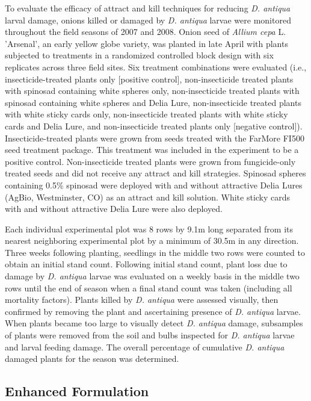 \documentclass[alpha-refs]{wiley-article}
\begin{document}
To evaluate the efficacy of attract and kill techniques for reducing \textit{D. antiqua} larval damage, onions killed or damaged by \textit{D. antiqua} larvae were monitored throughout the field seasons of 2007 and 2008. Onion seed of \textit{Allium cepa} L. ’Arsenal’, an early yellow globe variety, was planted in late April with plants subjected to treatments in a randomized controlled block design with six replicates across three field sites.  Six treatment combinations were evaluated (i.e., insecticide-treated plants only [positive control], non-insecticide treated plants with spinosad containing white spheres only, non-insecticide treated plants with spinosad containing white spheres and Delia Lure, non-insecticide treated plants with white sticky cards only, non-insecticide treated plants with white sticky cards and Delia Lure, and non-insecticide treated plants only [negative control]).  Insecticide-treated plants were grown from seeds treated with the FarMore FI500 seed treatment package. This treatment was included in the experiment to be a positive control. Non-insecticide treated plants were grown from fungicide-only treated seeds and did not receive any attract and kill strategies. Spinosad spheres containing 0.5\% spinosad were deployed with and without attractive Delia Lures (AgBio, Westminster, CO) as an attract and kill solution. White sticky cards with and without attractive Delia Lure were also deployed. 

Each individual experimental plot was 8 rows by 9.1m  long separated from its nearest neighboring experimental plot by a minimum of 30.5m  in any direction. Three weeks following planting, seedlings in the middle two rows were counted to obtain an initial stand count. Following initial stand count, plant loss due to damage by \textit{D. antiqua} larvae was evaluated on a weekly basis in the middle two rows until the end of season when a final stand count was taken (including all mortality factors). Plants killed by \textit{D. antiqua} were assessed visually, then confirmed by removing the plant and ascertaining presence of \textit{D. antiqua} larvae. When plants became too large to visually detect \textit{D. antiqua} damage, subsamples of plants were removed from the soil and bulbs inspected for \textit{D. antiqua} larvae and larval feeding damage. The overall percentage of cumulative \textit{D. antiqua} damaged plants for the season was determined. 

\subsection{Enhanced Formulation}
\end{document}

